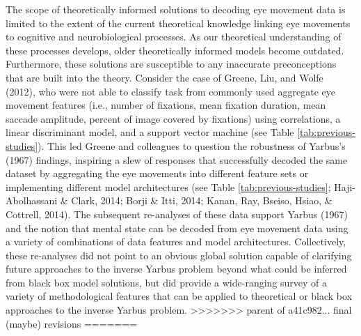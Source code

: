 \documentclass[
  english,
  man, donotrepeattitle,floatsintext]{apa6}
\begin{document}
The scope of theoretically informed solutions to decoding eye movement data is limited to the extent of the current theoretical knowledge linking eye movements to cognitive and neurobiological processes. As our theoretical understanding of these processes develops, older theoretically informed models become outdated. Furthermore, these solutions are susceptible to any inaccurate preconceptions that are built into the theory. Consider the case of Greene, Liu, and Wolfe (2012), who were not able to classify task from commonly used aggregate eye movement features (i.e., number of fixations, mean fixation duration, mean saccade amplitude, percent of image covered by fixations) using correlations, a linear discriminant model, and a support vector machine (see Table \ref{tab:previous-studies}). This led Greene and colleagues to question the robustness of Yarbus's (1967) findings, inspiring a slew of responses that successfully decoded the same dataset by aggregating the eye movements into different feature sets or implementing different model architectures (see Table \ref{tab:previous-studies}; Haji-Abolhassani \& Clark, 2014; Borji \& Itti, 2014; Kanan, Ray, Bseiso, Hsiao, \& Cottrell, 2014). The subsequent re-analyses of these data support Yarbus (1967) and the notion that mental state can be decoded from eye movement data using a variety of combinations of data features and model architectures. Collectively, these re-analyses did not point to an obvious global solution capable of clarifying future approaches to the inverse Yarbus problem beyond what could be inferred from black box model solutions, but did provide a wide-ranging survey of a variety of methodological features that can be applied to theoretical or black box approaches to the inverse Yarbus problem.
>>>>>>> parent of a41c982... final (maybe) revisions
=======
\end{document}
